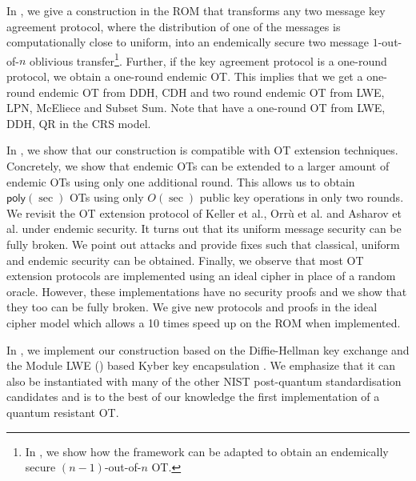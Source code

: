 In , we give a construction in the ROM that transforms any two message key agreement protocol, where the distribution of one of the messages is computationally close to uniform, into an endemically secure two message $1$-out-of-$n$ oblivious transfer\footnote{In , we show how the framework can be adapted to obtain an endemically secure $(n-1)$-out-of-$n$ OT.}. Further, 
if the key agreement protocol is a one-round protocol, we obtain a one-round endemic OT. This implies that we get a one-round endemic OT from DDH, CDH and two round endemic OT from LWE, LPN, McEliece and Subset Sum. Note that \cite{TCC:GarIshSri18} have a one-round OT from LWE, DDH, QR in the CRS model.

In , we show that our construction is compatible with OT extension techniques. Concretely, we show that endemic OTs can be extended to a larger amount of endemic OTs using only one additional round. This allows us to obtain $\mathsf{poly}(\sec)$ OTs using only $O(\sec)$ public key operations in only two rounds. We revisit the OT extension protocol of Keller et al., Orr{\`u} et al. and Asharov et al. \cite{C:KelOrsSch15,RSA:OrrOrsSch17,JC:ALSZ17} under endemic security. It turns out that its uniform message security can be fully broken. We point out attacks and provide fixes such that classical, uniform and endemic security can be obtained. Finally, we observe that most OT extension protocols are implemented \cite{libOTe,KOS,EMP} using an ideal cipher in place of a random oracle. However, these implementations have no security proofs and we show that they too can be fully broken. We give new protocols and proofs in the ideal cipher model which allows a 10 times speed up on the ROM when implemented.  

In , we implement our construction based on the Diffie-Hellman key exchange and the Module LWE (\MLWE) based Kyber key encapsulation \cite{NISTPQC-R1:CRYSTALS-KYBER17}. We emphasize that it can also be instantiated with many of the other NIST post-quantum standardisation candidates and is to the best of our knowledge the first implementation of a quantum resistant OT.


